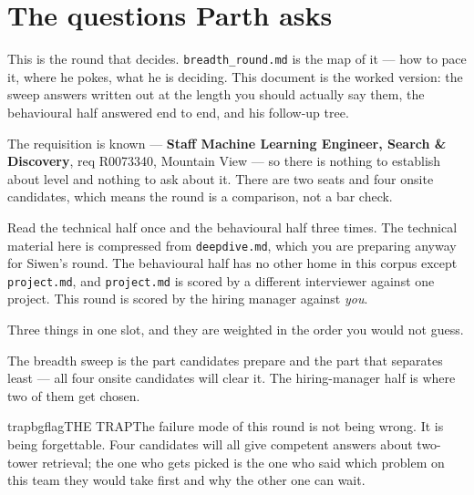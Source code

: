 \documentclass[10pt,twoside]{book}
\makeatletter
\newcommand{\cchapter}[1]{\chapter{#1}}
\newcommand{\csection}[1]{\par\vspace{13pt}\noindent{\sffamily\large\bfseries\color{ink}\raggedright #1\par}\vspace{4pt}}
\newenvironment{callout}{\begin{tcolorbox}[colback=soft,colframe=accent,boxrule=0.5pt,left=7pt,right=7pt,top=5pt,bottom=5pt]}{\end{tcolorbox}}
\newenvironment{callouttrap}{\begin{co@box}{trapbg}{flag}{THE TRAP}}{\end{co@box}}
\makeatother
\begin{document}
\cchapter{The questions Parth asks}
This is the round that decides. \texttt{breadth\_round.md} is the map of it --- how to pace it, where he pokes, what he is deciding. This document is the worked version: the sweep answers written out at the length you should actually say them, the behavioural half answered end to end, and his follow-up tree.\par
The requisition is known --- \textbf{Staff Machine Learning Engineer, Search \& Discovery}, req R0073340, Mountain View --- so there is nothing to establish about level and nothing to ask about it. There are two seats and four onsite candidates, which means the round is a comparison, not a bar check.\par
\begin{callout}Read the technical half once and the behavioural half three times. The technical material here is compressed from \texttt{deepdive.md}, which you are preparing anyway for Siwen's round. The behavioural half has no other home in this corpus except \texttt{project.md}, and \texttt{project.md} is scored by a different interviewer against one project. This round is scored by the hiring manager against \textit{you}.\end{callout}
\csection{What is actually being tested}
Three things in one slot, and they are weighted in the order you would not guess.\par
\par{}\par\medskip
The breadth sweep is the part candidates prepare and the part that separates least --- all four onsite candidates will clear it. The hiring-manager half is where two of them get chosen.\par
\begin{callouttrap}The failure mode of this round is not being wrong. It is being forgettable. Four candidates will all give competent answers about two-tower retrieval; the one who gets picked is the one who said which problem on this team they would take first and why the other one can wait.\end{callouttrap}
\end{document}

